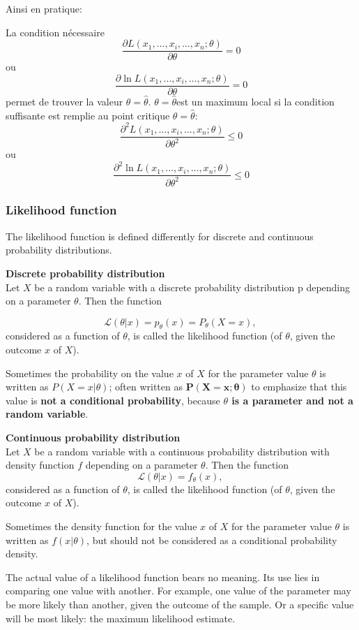 \documentclass{article}
\begin{document}
Ainsi en pratique:

La condition n\'ecessaire
$$ \frac{\partial L(x_1, \ldots, x_i, \ldots, x_n;\theta)}{\partial \theta} = 0 $$
ou
$$ \frac{\partial \ln L(x_1, \ldots, x_i, \ldots, x_n;\theta)}{\partial \theta} = 0 $$
permet de trouver la valeur $\theta = \hat \theta$.
$\theta = \hat \theta $est un maximum local si la condition suffisante est remplie au point critique $\theta = \hat \theta $:
$$ \frac{\partial^2 L(x_1, \ldots, x_i, \ldots, x_n;\theta)}{\partial \theta^2} \le 0 $$
ou
$$ \frac{\partial^2 \ln L(x_1, \ldots, x_i, \ldots,x_n;\theta)}{\partial \theta^2} \le 0 $$

\subsubsection{Likelihood function}
The likelihood function is defined differently for discrete and continuous probability distributions.

\textbf{Discrete probability distribution}\\
Let $X$ be a random variable with a discrete probability distribution p depending on a parameter $\theta$. Then the function

$$ \mathcal{L}(\theta |x) = p_\theta (x) = P_\theta (X=x), \, $$
considered as a function of $\theta$, is called the likelihood function (of $\theta$, given the outcome $x$ of $X$).

Sometimes the probability on the value $x$ of $X$ for the parameter value $\theta$ is written as $P(X=x|\theta)$; often written as $\mathbf{P(X=x;\theta)}$ to emphasize that this value is \textbf{not a conditional probability}, because \textbf{$\theta$ is a parameter and not a random variable}.

\textbf{Continuous probability distribution}\\
Let $X$ be a random variable with a continuous probability distribution with density function $f$ depending on a parameter $\theta$. Then the function
$$ \mathcal{L}(\theta |x) = f_{\theta} (x), \, $$
considered as a function of $\theta$, is called the likelihood function (of $\theta$, given the outcome $x$ of $X$).

Sometimes the density function for the value $x$ of $X$ for the parameter value $\theta$ is written as $f(x|\theta)$,
but should not be considered as a conditional probability density.

The actual value of a likelihood function bears no meaning. Its use lies in comparing one value with another.
For example, one value of the parameter may be more likely than another, given the outcome of the sample.
Or a specific value will be most likely: the maximum likelihood estimate.
\end{document}
